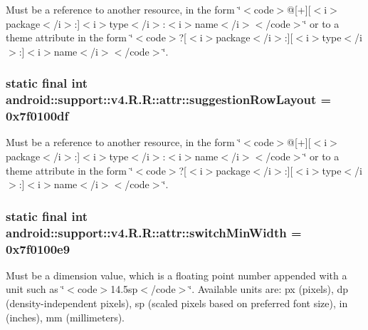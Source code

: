 Must be a reference to another resource, in the form \char`\"{}$<$code$>$@\mbox{[}+\mbox{]}\mbox{[}$<$i$>$package$<$/i$>$:\mbox{]}$<$i$>$type$<$/i$>$:$<$i$>$name$<$/i$>$$<$/code$>$\char`\"{} or to a theme attribute in the form \char`\"{}$<$code$>$?\mbox{[}$<$i$>$package$<$/i$>$:\mbox{]}\mbox{[}$<$i$>$type$<$/i$>$:\mbox{]}$<$i$>$name$<$/i$>$$<$/code$>$\char`\"{}. \hypertarget{classandroid_1_1support_1_1v4_1_1_r_1_1attr_6718d46cc2a84e65a419df73830133ab}{
\subsubsection[{suggestionRowLayout}]{\setlength{\rightskip}{0pt plus 5cm}static final int android::support::v4.R.R::attr::suggestionRowLayout = 0x7f0100df}}
\label{classandroid_1_1support_1_1v4_1_1_r_1_1attr_6718d46cc2a84e65a419df73830133ab}


Must be a reference to another resource, in the form \char`\"{}$<$code$>$@\mbox{[}+\mbox{]}\mbox{[}$<$i$>$package$<$/i$>$:\mbox{]}$<$i$>$type$<$/i$>$:$<$i$>$name$<$/i$>$$<$/code$>$\char`\"{} or to a theme attribute in the form \char`\"{}$<$code$>$?\mbox{[}$<$i$>$package$<$/i$>$:\mbox{]}\mbox{[}$<$i$>$type$<$/i$>$:\mbox{]}$<$i$>$name$<$/i$>$$<$/code$>$\char`\"{}. \hypertarget{classandroid_1_1support_1_1v4_1_1_r_1_1attr_f25d67885698da9df9803f1ef3eb9736}{
\subsubsection[{switchMinWidth}]{\setlength{\rightskip}{0pt plus 5cm}static final int android::support::v4.R.R::attr::switchMinWidth = 0x7f0100e9}}
\label{classandroid_1_1support_1_1v4_1_1_r_1_1attr_f25d67885698da9df9803f1ef3eb9736}


Must be a dimension value, which is a floating point number appended with a unit such as \char`\"{}$<$code$>$14.5sp$<$/code$>$\char`\"{}. Available units are: px (pixels), dp (density-independent pixels), sp (scaled pixels based on preferred font size), in (inches), mm (millimeters). 

